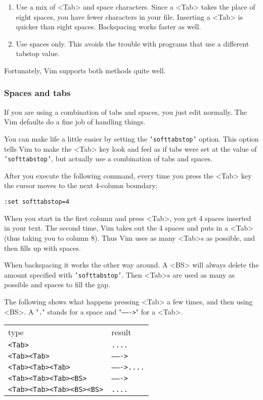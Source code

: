 {\begin{enumerate}
				\item Use a mix of <Tab> and space characters.
								Since a <Tab> takes the place of eight spaces, you have fewer characters in your file.
								Inserting a <Tab> is quicker than eight spaces.
								Backspacing works faster as well.
				\item Use spaces only.
								This avoids the trouble with programs that use a different tabstop value.
\end{enumerate}

Fortunately, Vim supports both methods quite well.
\subsubsection{Spaces and tabs}
If you are using a combination of tabs and spaces, you just edit normally.
The Vim defaults do a fine job of handling things.

You can make life a little easier by setting the \texttt{'softtabstop'} option.
This option tells Vim to make the <Tab> key look and feel as if tabs were set at the value of \texttt{'softtabstop'}, but actually use a combination of tabs and spaces.

After you execute the following command, every time you press the <Tab> key the cursor moves to the next 4-column boundary:

\begin{Verbatim}[samepage=true]
 :set softtabstop=4
\end{Verbatim}

When you start in the first column and press <Tab>, you get 4 spaces inserted in your text.
The second time, Vim takes out the 4 spaces and puts in a <Tab> (thus taking you to column 8).
Thus Vim uses as many <Tab>s as possible, and then fills up with spaces.

When backspacing it works the other way around.
A <BS> will always delete the amount specified with \texttt{'softtabstop'}.
Then <Tab>s are used as many as possible and spaces to fill the gap.

The following shows what happens pressing <Tab> a few times, and then using <BS>.
A "\texttt{.}" stands for a space and "\texttt{------->}" for a <Tab>.

\begin{center} \begin{tabular}{l l}
type & result \\ 
\texttt{<Tab>} & \texttt{....} \\
\texttt{<Tab><Tab>} & \texttt{------->} \\
\texttt{<Tab><Tab><Tab>} & \texttt{------->....} \\
\texttt{<Tab><Tab><Tab><BS>} & \texttt{------->} \\
\texttt{<Tab><Tab><Tab><BS><BS>} & \texttt{....} \\		
\end{tabular} \end{center}

}

